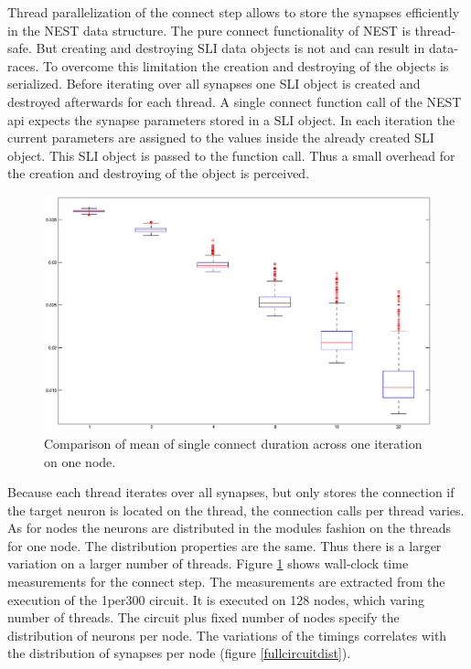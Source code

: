 Thread parallelization of the connect step allows to store the synapses efficiently in the NEST data structure.
The pure connect functionality of NEST is thread-safe. But creating and destroying SLI data objects is not and can result
in data-races. To overcome this limitation the creation and destroying of the objects is serialized. Before iterating over all synapses one SLI object is created and destroyed afterwards for each thread. A single connect function
call of the NEST api expects the synapse parameters stored in a SLI object. In each iteration the current
parameters are assigned to the values inside the already created SLI object. This SLI object is passed to the function call.
Thus a small overhead for the creation and destroying of the object is perceived.
\begin{figure}[ht!]
\centering
\includegraphics[scale=0.3]{pictures/boxplot_new_con_dt_1_300.eps}
\caption{Comparison of mean of single connect duration across one iteration on one node.}
\label{boxplotnewcon}
\end{figure}
Because each thread iterates over all synapses, but only stores the connection if the target neuron is located on
the thread, the connection calls per thread varies.
As for nodes the neurons are distributed in the modules fashion on the threads for one node.
The distribution properties are the same. Thus there is a larger variation on a larger number of threads.
Figure \ref{boxplotnewcon} shows wall-clock time measurements for the connect step. The measurements are
extracted from the execution of the 1per300 circuit. It is executed on 128 nodes, which varing number of
threads. The circuit plus fixed number of nodes specify the distribution of neurons per node.
The variations of the timings correlates with the distribution of synapses per node (figure \ref{fullcircuitdist}).
